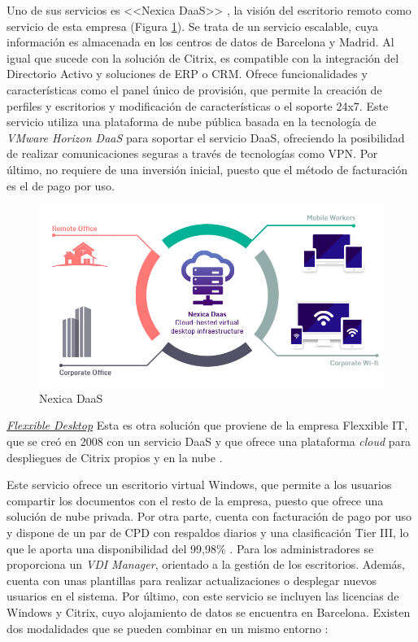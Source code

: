 Uno de sus servicios es <<Nexica \acs{DaaS}>> \cite{nexicadaas}, la visión del escritorio remoto como servicio de esta empresa (Figura \ref{fig:nexica_daas}). Se trata de un servicio escalable, cuya información es almacenada en los centros de datos de Barcelona y Madrid. Al igual que sucede con la solución de Citrix, es compatible con la integración del Directorio Activo y soluciones de \acf{ERP} o \acf{CRM}. Ofrece funcionalidades y características como el panel único de provisión, que permite la creación de perfiles y escritorios y modificación de características o el soporte 24x7. Este servicio utiliza una plataforma de nube pública basada en la tecnología de \textit{VMware Horizon \acs{DaaS}} para soportar el servicio \acs{DaaS}, ofreciendo la posibilidad de realizar comunicaciones seguras a través de tecnologías como \acs{VPN}. Por último, no requiere de una inversión inicial, puesto que el método de facturación es el de pago por uso.

\begin{figure}[h]
    \centering
    \includegraphics[width=0.8\linewidth]{figures/images/nexica_daas.png}
    \caption{Nexica \acs{DaaS}}
    \label{fig:nexica_daas}
\end{figure}

\clearpage

\noindent\underline{\textit{Flexxible Desktop}}\newline
\indent Esta es otra solución que proviene de la empresa Flexxible IT, que se creó en 2008 con un servicio \acs{DaaS} y que ofrece una plataforma \textit{cloud} para despliegues de Citrix propios y en la nube \cite{flexxibleitabout}.

Este servicio ofrece un escritorio virtual Windows, que permite a los usuarios compartir los documentos con el resto de la empresa, puesto que ofrece una solución de nube privada. Por otra parte, cuenta con facturación de pago por uso y dispone de un par de \acf{CPD} con respaldos diarios y una clasificación Tier III, lo que le aporta una disponibilidad del 99,98\% \cite{flexxiblebeneficios}. Para los administradores se proporciona un \textit{VDI Manager}, orientado a la gestión de los escritorios. Además, cuenta con unas plantillas para realizar actualizaciones o desplegar nuevos usuarios en el sistema. Por último, con este servicio se incluyen las licencias de Windows y Citrix, cuyo alojamiento de datos se encuentra en Barcelona. Existen dos modalidades que se pueden combinar en un mismo entorno \cite{flexxiblequeincluye}: 

